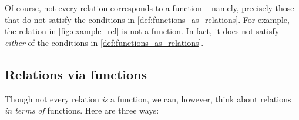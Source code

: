 \begin{remark}
    Of course, not every relation corresponds to a function -- namely, precisely those that do not satisfy the conditions in \cref{def:functions_as_relations}.
    For example, the relation in \cref{fig:example_rel} is not a function.
    In fact, it does not satisfy \emph{either} of the conditions in \cref{def:functions_as_relations}.
\end{remark}


\subsection{Relations via functions}

\label{rem:rel-three-fun-descriptions}
Though not every relation \emph{is} a function, we can, however, think about relations \emph{in terms of} functions.
Here are three ways:
